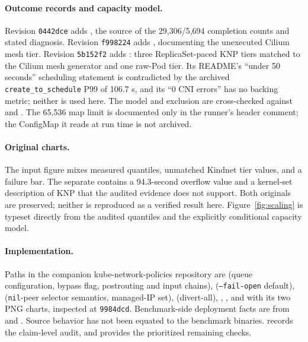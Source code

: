 \documentclass[letterpaper,twocolumn,10pt]{article}
\newcommand{\sys}{\textsc{KNP}}
\begin{document}
\paragraph{Outcome records and capacity model.}
Revision \texttt{0442dce} adds
,
the source of the 29,306/5,694 completion counts and stated diagnosis.
Revision \texttt{f998224} adds
, documenting the
unexecuted Cilium mesh tier. Revision \texttt{5b152f2} adds
: three ReplicaSet-paced
\sys{} tiers matched to the Cilium mesh generator and one raw-Pod tier.
Its README's ``under 50 seconds'' scheduling statement is contradicted
by the archived \texttt{create\_to\_schedule} P99 of 106.7 s, and its
``0 CNI errors'' has no backing metric; neither is used here.
The model and exclusion are cross-checked against
 and
.
The 65,536 map limit is documented only in the runner's header comment;
the ConfigMap it reads at run time is not archived.

\paragraph{Original charts.}
The input figure 
mixes measured quantiles, unmatched Kindnet tier values, and a failure
bar. The separate 
contains a 94.3-second overflow value and a kernel-set description of
\sys{} that the audited evidence does not support. Both originals
are preserved; neither is reproduced as a verified result here.
Figure~\ref{fig:scaling} is typeset directly from the audited quantiles
and the explicitly conditional capacity model.

\paragraph{Implementation.}
Paths in the companion kube-network-policies repository are
 (queue configuration, bypass flag,
postrouting and input chains), 
(\texttt{--fail-open} default), 
(\texttt{nil}-peer selector semantics, managed-IP set),
 (divert-all),
, ,
and  with its two PNG charts, inspected at
\texttt{9984dcd}. Benchmark-side deployment facts are from
 and
. Source behavior has not been equated
to the benchmark binaries.  records
the claim-level audit, and 
provides the prioritized remaining checks.
\end{document}
